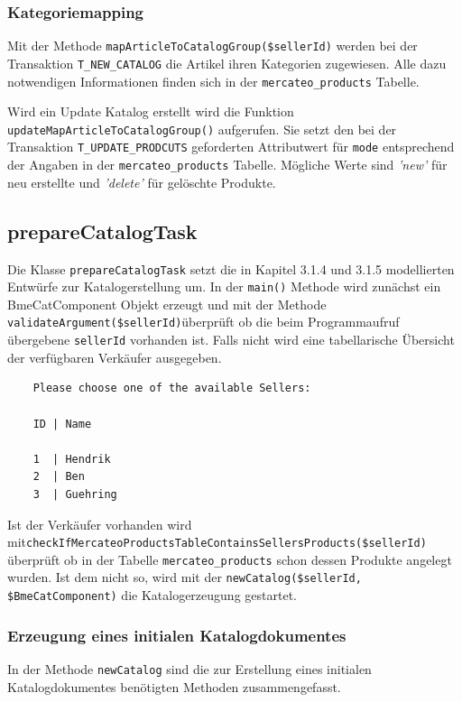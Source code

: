 	\subsubsection{Kategoriemapping}
	
	Mit der Methode \texttt{mapArticleToCatalogGroup(\$sellerId)} werden bei der Transaktion \texttt{T\_NEW\_CATALOG} die Artikel ihren Kategorien zugewiesen. Alle dazu notwendigen Informationen finden sich in der \texttt{mercateo\_products} Tabelle.
	
	Wird ein Update Katalog erstellt wird die Funktion \texttt{updateMapArticleToCatalogGroup()} aufgerufen. Sie setzt den bei der Transaktion \texttt{T\_UPDATE\_PRODCUTS} geforderten Attributwert für \texttt{mode} entsprechend der Angaben in der \texttt{mercateo\_products} Tabelle.
	Mögliche Werte sind \textit{'new'} für neu erstellte und \textit{'delete'} für gelöschte Produkte.
	
	
	\subsection{prepareCatalogTask}
	
	Die Klasse \texttt{prepareCatalogTask} setzt die in Kapitel 3.1.4 und 3.1.5 modellierten Entwürfe zur Katalogerstellung um. In der \texttt{main()} Methode wird zunächst ein BmeCatComponent Objekt erzeugt und mit der Methode \texttt{validateArgument(\$sellerId)}überprüft ob die beim Programmaufruf übergebene \texttt{sellerId} vorhanden ist. Falls nicht wird eine tabellarische Übersicht der verfügbaren Verkäufer ausgegeben.
	\begin{lstlisting}
	Please choose one of the available Sellers:
	
	ID | Name
	
	1  | Hendrik
	2  | Ben
	3  | Guehring
	\end{lstlisting}
	
	Ist der Verkäufer vorhanden wird mit\texttt{checkIfMercateoProductsTableContainsSellersPro\-ducts(\$sellerId)} überprüft ob in der Tabelle \texttt{mercateo\_products} schon dessen Produkte angelegt wurden. Ist dem nicht so, wird mit der \texttt{newCatalog(\$sellerId, \$BmeCatComponent)} die Katalogerzeugung gestartet.
	
	\subsubsection{Erzeugung eines initialen Katalogdokumentes}
	
	In der Methode \texttt{newCatalog} sind die zur Erstellung eines initialen Katalogdokumentes benötigten Methoden zusammengefasst.
	 
